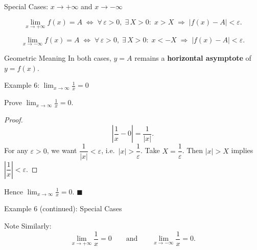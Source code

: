 \documentclass[aspectratio=169,10pt]{beamer}
\begin{document}
\begin{frame}{Special Cases: $x\to+\infty$ and $x\to-\infty$}
  \begin{definition}[$x\to+\infty$]
    \[
      \lim_{x\to+\infty}f(x)=A
      \;\Longleftrightarrow\;
      \forall\,\varepsilon>0,\;\exists\,X>0:\;
      x>X \;\Longrightarrow\; |f(x)-A|<\varepsilon.
    \]
  \end{definition}
  \pause
  \begin{definition}[$x\to-\infty$]
    \[
      \lim_{x\to-\infty}f(x)=A
      \;\Longleftrightarrow\;
      \forall\,\varepsilon>0,\;\exists\,X>0:\;
      x<-X \;\Longrightarrow\; |f(x)-A|<\varepsilon.
    \]
  \end{definition}
  \pause
  \begin{block}{Geometric Meaning}
    In both cases, $y=A$ remains a \textbf{horizontal asymptote} of $y=f(x)$.
  \end{block}
\end{frame}

\begin{frame}{Example 6: $\displaystyle\lim_{x\to\infty}\frac{1}{x}=0$}
  \begin{example}
    Prove $\displaystyle\lim_{x\to\infty}\frac{1}{x}=0$.
  \end{example}
  \pause
  \begin{proof}[Proof]
    \[
      \left|\frac{1}{x}-0\right| = \frac{1}{|x|}.
    \]
    \pause
    For any $\varepsilon>0$, we want $\dfrac{1}{|x|}<\varepsilon$, i.e.\ $|x|>\dfrac{1}{\varepsilon}$.
    \pause
    Take $X = \dfrac{1}{\varepsilon}$.
    Then $|x|>X$ implies $\left|\dfrac{1}{x}\right|<\varepsilon$.
  \end{proof}
  \pause
  \begin{center}
    Hence $\displaystyle\lim_{x\to\infty}\frac{1}{x}=0$. \hfill$\blacksquare$
  \end{center}
\end{frame}

\begin{frame}{Example 6 (continued): Special Cases}
  \begin{alertblock}{Note}
    Similarly:
    \[
      \lim_{x\to+\infty}\frac{1}{x}=0
      \qquad\text{and}\qquad
      \lim_{x\to-\infty}\frac{1}{x}=0.
    \]
  \end{alertblock}
\end{frame}
\end{document}
